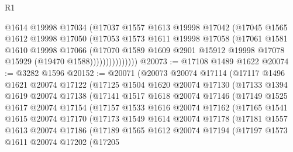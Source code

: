 \begin{lexlean}{R1}
\begin{coremodule}
                      @1614
                      @19998
                      @17034
                      (@17037
                        @1557
                        @1613
                        @19998
                        @17042
                        (@17045
                          @1565
                          @1612
                          @19998
                          @17050
                          (@17053
                            @1573
                            @1611
                            @19998
                            @17058
                            (@17061
                              @1581
                              @1610
                              @19998
                              @17066
                              (@17070
                                @1589
                                @1609
                                @2901
                                @15912
                                @19998
                                @17078
                                @15929
                                (@19470 @1588)))))))))))))))
@20073 := @17108 @1489 @1622
@20074 := @3282 @1596
@20152 := @20071
    (@20073
      @20074
      @17114
      (@17117
        @1496
        @1621
        @20074
        @17122
        (@17125
          @1504
          @1620
          @20074
          @17130
          (@17133
            @1394
            @1619
            @20074
            @17138
            (@17141
              @1517
              @1618
              @20074
              @17146
              (@17149
                @1525
                @1617
                @20074
                @17154
                (@17157
                  @1533
                  @1616
                  @20074
                  @17162
                  (@17165
                    @1541
                    @1615
                    @20074
                    @17170
                    (@17173
                      @1549
                      @1614
                      @20074
                      @17178
                      (@17181
                        @1557
                        @1613
                        @20074
                        @17186
                        (@17189
                          @1565
                          @1612
                          @20074
                          @17194
                          (@17197
                            @1573
                            @1611
                            @20074
                            @17202
                            (@17205

\end{coremodule}
\end{lexlean}
